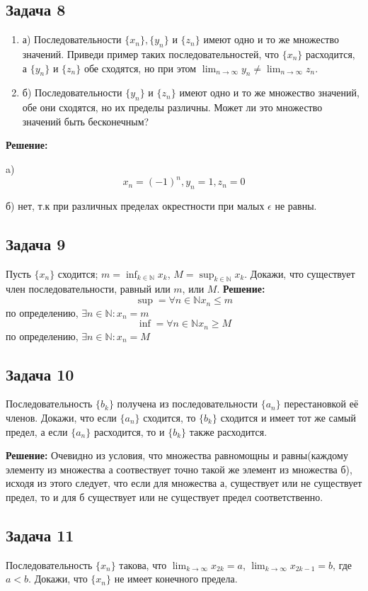 \documentclass[a4paper,12pt]{article}
\begin{document}
\subsection{Задача 8}
\begin{enumerate}
    \item а) Последовательности $\{x_n\}, \{y_n\}$ и $\{z_n\}$ имеют одно и то же множество значений. Приведи пример таких последовательностей, что $\{x_n\}$ расходится, а $\{y_n\}$ и $\{z_n\}$ обе сходятся, но при этом $\lim_{n \to \infty} y_n \neq \lim_{n \to \infty} z_n$.
    \item б) Последовательности $\{y_n\}$ и $\{z_n\}$ имеют одно и то же множество значений, обе они сходятся, но их пределы различны. Может ли это множество значений быть бесконечным?
\end{enumerate}

\textbf{Решение:}

a)
\[
x_n = (-1)^n, y_n = 1, z_n = 0
\]

б) нет, т.к при различных пределах окрестности при малых $\epsilon$ не равны.

\subsection{Задача 9}
Пусть $\{x_n\}$ сходится; $m = \inf_{k \in \mathbb{N}} x_k$, $M = \sup_{k \in \mathbb{N}} x_k$. Докажи, что существует член последовательности, равный или $m$, или $M$.
\textbf{Решение: }
\[
\sup = \forall n \in \mathbb{N} x_n \le m
\]
по определению, $\exists n \in \mathbb{N}: x_n = m$
\[
\inf = \forall n \in \mathbb{N} x_n \ge M
\]
по определению, $\exists n \in \mathbb{N}: x_n = M$

\subsection{Задача 10}
Последовательность $\{b_k\}$ получена из последовательности $\{a_n\}$ перестановкой её членов. Докажи, что если $\{a_n\}$ сходится, то $\{b_k\}$ сходится и имеет тот же самый предел, а если $\{a_n\}$ расходится, то и $\{b_k\}$ также расходится.

\textbf{Решение: }
Очевидно из условия, что множества равномощны и равны(каждому элементу из множества а соотвествует точно такой же элемент из множества б), исходя из этого следует, что если для множества а, существует или не существует предел, то и для б существует или не существует предел соответственно.

\subsection{Задача 11}
Последовательность $\{x_n\}$ такова, что $\lim_{k \to \infty} x_{2k} = a$, $\lim_{k \to \infty} x_{2k-1} = b$, где $a < b$. Докажи, что $\{x_n\}$ не имеет конечного предела.
\end{document}
